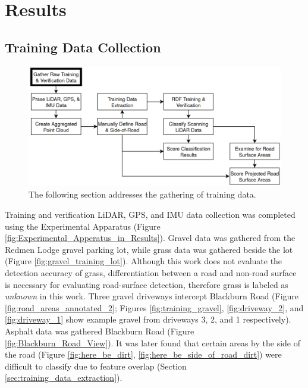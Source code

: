 \documentclass[numbered,pdftex]{ohio-etd}
\begin{document}
\chapter{Results}{
	
	\section{Training Data Collection}\label{sec:training-data-collection}{
		
		\begin{figure}[H]
			\centering
			\includegraphics[width=0.9\linewidth]{Defense_Images/flowz_gather_data}
			\caption[Training Data Collection Flowchart Context]{The following section addresses the gathering of training data.}
			\label{fig:flowz_gather_data}
		\end{figure}
	
		{Training and verification LiDAR, GPS, and IMU data collection was completed using the Experimental Apparatus (Figure \ref{fig:Experimental_Apperatus_in_Results}). Gravel data was gathered from the Redmen Lodge gravel parking lot, while grass data was gathered beside the lot (Figure \ref{fig:gravel_training_lot}). Although this work does not evaluate the detection accuracy of grass, differentiation between a road and non-road surface is necessary for evaluating road-surface detection, therefore grass is labeled as \textit{unknown} in this work. Three gravel driveways intercept Blackburn Road (Figure \ref{fig:road_areas_annotated_2}; Figures \ref{fig:training_gravel}, \ref{fig:driveway_2}, and \ref{fig:driveway_1} show example gravel from driveways 3, 2, and 1 respectively). Asphalt data was gathered Blackburn Road (Figure \ref{fig:Blackburn_Road_View}). It was later found that certain areas by the side of the road (Figure \ref{fig:here_be_dirt}, \ref{fig:here_be_side_of_road_dirt}) were difficult to classify due to feature overlap (Section \ref{sec:training_data_extraction}). }
			
}}
\end{document}
